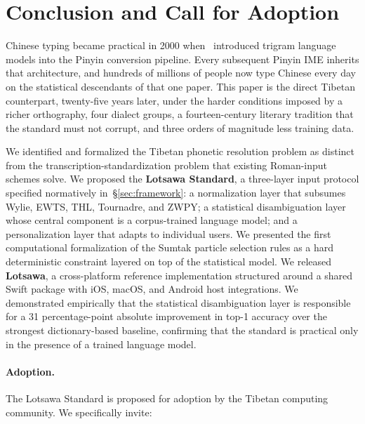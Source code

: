 \documentclass[11pt]{article}
\begin{document}
\section{Conclusion and Call for Adoption}
\label{sec:conclusion}

Chinese typing became practical in 2000 when~\citet{chen2000pinyin} introduced trigram language models into the Pinyin conversion pipeline. Every subsequent Pinyin IME inherits that architecture, and hundreds of millions of people now type Chinese every day on the statistical descendants of that one paper. This paper is the direct Tibetan counterpart, twenty-five years later, under the harder conditions imposed by a richer orthography, four dialect groups, a fourteen-century literary tradition that the standard must not corrupt, and three orders of magnitude less training data.

We identified and formalized the Tibetan phonetic resolution problem as distinct from the transcription-standardization problem that existing Roman-input schemes solve. We proposed the \textbf{Lotsawa Standard}, a three-layer input protocol specified normatively in~\S\ref{sec:framework}: a normalization layer that subsumes Wylie, EWTS, THL, Tournadre, and ZWPY; a statistical disambiguation layer whose central component is a corpus-trained language model; and a personalization layer that adapts to individual users. We presented the first computational formalization of the Sumtak particle selection rules as a hard deterministic constraint layered on top of the statistical model. We released \textbf{Lotsawa}, a cross-platform reference implementation structured around a shared Swift package with iOS, macOS, and Android host integrations. We demonstrated empirically that the statistical disambiguation layer is responsible for a 31 percentage-point absolute improvement in top-1 accuracy over the strongest dictionary-based baseline, confirming that the standard is practical only in the presence of a trained language model.

\paragraph{Adoption.} The Lotsawa Standard is proposed for adoption by the Tibetan computing community. We specifically invite:
\end{document}
